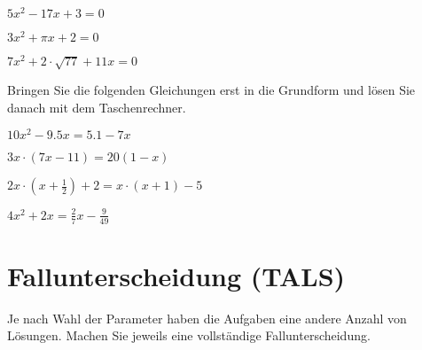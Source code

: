 \begin{bbwAufgabenBlock}
\item $ 5x^2-17x+3= 0$

\item $ 3x^2+\pi x + 2= 0$
\LoesungsBlock{$\lx= \left\{  \right\}$}

\item $ 7x^2 + 2\cdot{}\sqrt{77} + 11x= 0$

Bringen Sie die folgenden Gleichungen erst in die Grundform und lösen
Sie danach mit dem Taschenrechner.

\item $ 10x^2 -9.5x = 5.1 - 7x $

\item $ 3x\cdot{}(7x-11)= 20(1-x)$

\item $ 2x\cdot{}(x+\frac12) + 2 = x\cdot{}(x+1) -5 $
\LoesungsBlock{$\lx= \left\{   \right\}$}

\item $ 4x^2 + 2x = \frac27 x - \frac9{49} $


\end{bbwAufgabenBlock}
\newpage

\section{Fallunterscheidung (TALS)}

Je nach Wahl der Parameter haben die Aufgaben eine andere Anzahl von
Lösungen. Machen Sie jeweils eine vollständige Fallunterscheidung.


